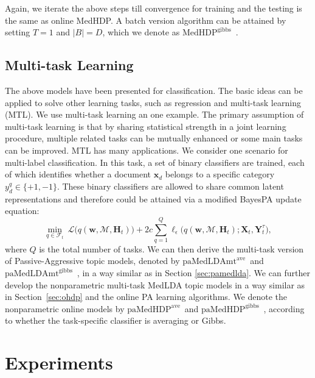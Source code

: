 \documentclass[twoside,11pt]{article}
\newcommand{\Hv}{\bm{H}}
\newcommand\paMedLDAmtave{$\text{paMedLDAmt}^{\text{ave}}$~}
\newcommand\paMedLDAmtgibbs{$\text{paMedLDAmt}^{\text{gibbs}}$~}
\newcommand\paMedHDPave{$\text{paMedHDP}^{\text{ave}}$~}
\newcommand\paMedHDPgibbs{$\text{paMedHDP}^{\text{gibbs}}$~}
\newcommand\MedHDPgibbs{$\text{MedHDP}^{\text{gibbs}}$~}
\newcommand{\junx}[1]{{\color{red}{\bf\sf #1}}}
\begin{document}
Again, we iterate the above steps till convergence for training and the testing is the same as online MedHDP. A batch version algorithm can be attained by setting $T = 1$ and $|B| = D$, which we denote as \MedHDPgibbs.


\subsection{Multi-task Learning}\label{sec:mtl}

The above models have been presented for classification. The basic ideas can be applied to solve other learning tasks, such as regression and multi-task learning (MTL). We use multi-task learning an one example. The primary assumption of multi-task learning is that by sharing statistical strength in a joint learning procedure, multiple related tasks can be mutually enhanced or some main tasks can be improved. MTL has many applications. We consider one scenario for multi-label classification. In this task, a set of binary classifiers are trained, each of which identifies whether a document $\bm{x}_d$ belongs to a specific category $y_d^{q} \in \{+1, -1\}$. These binary classifiers are allowed to share common latent representations and therefore could be attained via a modified BayesPA update equation:
\begin{equation*}
\label{eq:onlinepa_latent_mt}
\underset{q \in \mathcal{F}_t}{\operatorname{min}}{~\mathcal{L}\Big(q(\bm{w}, \bm{\mathcal{M}}, \Hv_t)\Big)+ 2 c \sum\limits_{q = 1}^{Q} \ell_\epsilon\Big(q(\bm{w}, \bm{\mathcal{M}}, \Hv_t); \bm{X}_t, \bm{Y}_t^\tau\Big)},
\end{equation*}
where $Q$ is the total number of tasks. We can then derive the multi-task version of Passive-Aggressive topic models, denoted by \paMedLDAmtave and \paMedLDAmtgibbs, in a way similar as in Section \ref{sec:pamedlda}. We can further develop the nonparametric multi-task MedLDA topic models in a way similar as in Section~\ref{sec:ohdp} and the online PA learning algorithms. We denote the nonparametric online models by \paMedHDPave and \paMedHDPgibbs, according to whether the task-specific classifier is averaging or Gibbs.


\section{Experiments}\label{sec:exp}
\end{document}
